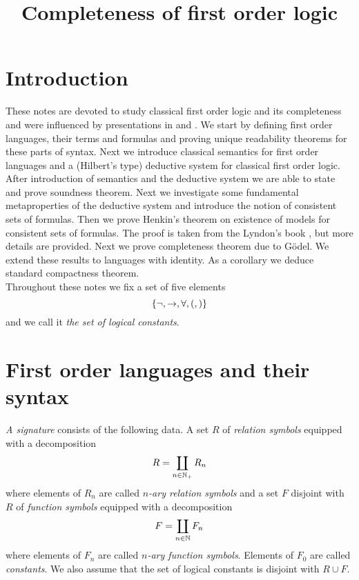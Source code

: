 



\title{Completeness of first order logic}
\date{}
\maketitle

\section{Introduction}
\noindent
These notes are devoted to study classical first order logic and its completeness and were influenced by presentations in \cite{enderton2001mathematical} and \cite{lyndon1966notes}. We start by defining first order languages, their terms and formulas and proving unique readability theorems for these parts of syntax. Next we introduce classical semantics for first order languages and a (Hilbert’s type) deductive system for classical first order logic. After introduction of semantics and the deductive system we are able to state and prove soundness theorem. Next we investigate some fundamental metaproperties of the deductive system and introduce the notion of consistent sets of formulas. Then we prove Henkin’s theorem on existence of models for consistent sets of formulas. The proof is taken from the Lyndon’s book \cite{lyndon1966notes}, but more details are provided. Next we prove completeness theorem due to Gödel. We extend these results to languages with identity. As a corollary we deduce standard compactness theorem.\\
Throughout these notes we fix a set of five elements
$$\{\neg, \rightarrow, \forall, (, )\}$$
and we call it \textit{the set of logical constants}.

\section{First order languages and their syntax}

\begin{definition}
\textit{A signature} consists of the following data. A set $R$ of \textit{relation symbols} equipped with a decomposition
$$R = \coprod_{n\in {\mathbb N}_+}R_n$$
where elements of $R_n$ are called \textit{$n$-ary relation symbols} and a set $F$ disjoint with $R$ of \textit{function symbols} equipped with a decomposition
$$F = \coprod_{n\in {\mathbb N}}F_n$$
where elements of $F_n$ are called \textit{$n$-ary function symbols}. Elements of $F_0$ are called \textit{constants}. We also assume that the set of logical constants is disjoint with $R\cup F$.
\end{definition}

